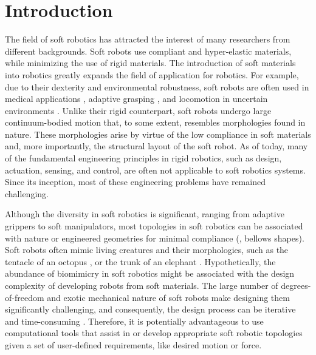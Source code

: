 \section{Introduction}
The field of soft robotics has attracted the interest of many researchers from different backgrounds. Soft robots use compliant and hyper-elastic materials, while minimizing the use of rigid materials. The introduction of soft materials into robotics greatly expands the field of application for robotics. For example, due to their dexterity and environmental robustness, soft robots are often used in medical applications \cite{Polygerinos2015, Yap2015, Asbeck2015Nov}, adaptive grasping \cite{Galloway2016, Hughes2016Nov}, and locomotion in uncertain environments \cite{Drotman2017}. Unlike their rigid counterpart, soft robots undergo large continuum-bodied motion that, to some extent, resembles morphologies found in nature. These morphologies arise by virtue of the low compliance in soft materials and, more importantly, the structural layout of the soft robot. As of today, many of the fundamental engineering principles in rigid robotics, such as design, actuation, sensing, and control, are often not applicable to soft robotics systems. Since its inception, most of these engineering problems have remained challenging.

Although the diversity in soft robotics is significant, ranging from adaptive grippers to soft manipulators, most topologies in soft robotics can be associated with nature or engineered geometries for minimal compliance (\eg, bellows shapes). Soft robots often mimic living creatures and their morphologies, such as the tentacle of an octopus \cite{Galloway2016, Wehner2016}, or the trunk of an elephant \cite{Drotman2017}. Hypothetically, the abundance of biomimicry in soft robotics might be associated with the design complexity of developing robots from soft materials. The large number of degrees-of-freedom and exotic mechanical nature of soft robots make designing them significantly challenging, and consequently, the design process can be iterative and time-consuming \cite{Wehner2016}. Therefore, it is potentially advantageous to use computational tools that assist in or develop appropriate soft robotic topologies given a set of user-defined requirements, like desired motion or force.

